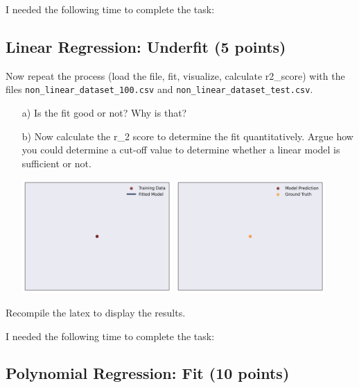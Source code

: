 I needed the following time to complete the task:

\subsection{Linear Regression: Underfit (5 points)}

Now repeat the process (load the file, fit, visualize, calculate r2\_score) with the files \texttt{non\_linear\_dataset\_100.csv} and \texttt{non\_linear\_dataset\_test.csv}.

\begin{enumerate}

\item[a)] Is the fit good or not? Why is that? 

\item[b)] Now calculate the r\_2 score to determine the fit quantitatively. Argue how you could determine a cut-off value to determine whether a linear model is sufficient or not.

\includegraphics[width=0.45\textwidth]{source_code/underfit_linear_model.png}
\includegraphics[width=0.45\textwidth]{source_code/underfit_linear_testdata.png}

\end{enumerate}

Recompile the latex to display the results.

I needed the following time to complete the task:

\subsection{Polynomial Regression: Fit (10 points)}

